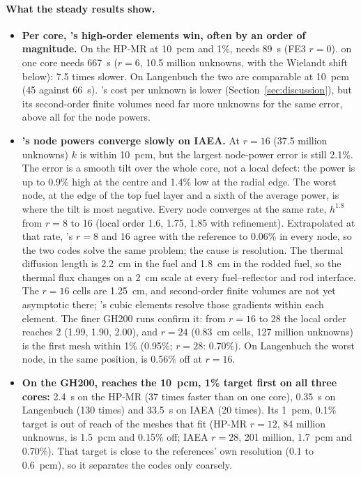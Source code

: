 \paragraph{What the steady results show.}
\begin{itemize}
\item \textbf{Per core, \ffn's high-order elements win, often by an order of
  magnitude.} On the HP-MR at 10~pcm and 1\%, \ffn{} needs 89~s (FE3 $r=0$).
  \garnet{} on one core needs 667~s ($r=6$, 10.5 million unknowns, with the
  Wielandt shift below): 7.5 times slower. On Langenbuch the two are
  comparable at 10~pcm (45 against 66~s).
  \garnet's cost per unknown is lower (Section~\ref{sec:discussion}), but its
  second-order finite volumes need far more unknowns for the same error,
  above all for the node powers.
\item \textbf{\garnet's node powers converge slowly on IAEA.} At $r=16$
  (37.5 million unknowns) $k$ is within 10~pcm, but the largest node-power
  error is still 2.1\%. The error is a smooth tilt over the whole core, not
  a local defect: the power is up to 0.9\% high at the centre and 1.4\% low
  at the radial edge. The worst node, at the edge of the top fuel layer and
  a sixth of the average power, is where the tilt is most negative. Every
  node converges at the same rate, $h^{1.8}$ from $r=8$ to 16 (local order
  1.6, 1.75, 1.85 with refinement). Extrapolated at that rate, \garnet's
  $r=8$ and 16 agree with the reference to 0.06\% in every node, so the two
  codes solve the same problem; the cause is resolution. The thermal
  diffusion length is 2.2~cm in the fuel and 1.8~cm in the rodded fuel, so
  the thermal flux changes on a 2~cm scale at every fuel--reflector and rod
  interface. The $r=16$ cells are 1.25~cm, and second-order finite volumes
  are not yet asymptotic there; \ffn's cubic elements resolve those
  gradients within each element. The finer GH200 runs confirm it: from
  $r=16$ to 28 the local order reaches 2 (1.99, 1.90, 2.00), and $r=24$
  (0.83~cm cells, 127 million unknowns) is the first mesh within 1\%
  (0.95\%; $r=28$: 0.70\%). On Langenbuch the worst node, in the same
  position, is 0.56\% off at $r=16$.
\item \textbf{On the GH200, \garnet{} reaches the 10~pcm, 1\% target first on
  all three cores:} 2.4~s on the HP-MR (37 times faster than \ffn{} on one
  core), 0.35~s on Langenbuch (130 times) and 33.5~s on IAEA (20 times). Its
  1~pcm, 0.1\% target is out of reach of the meshes that fit (HP-MR $r=12$,
  84 million unknowns, is 1.5~pcm and 0.15\% off; IAEA $r=28$, 201 million,
  1.7~pcm and 0.70\%). That target is close to the references' own
  resolution (0.1 to 0.6~pcm), so it separates the codes only coarsely.
\end{itemize}

